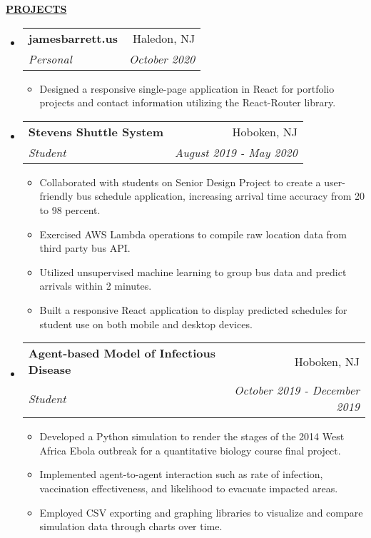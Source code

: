 \documentclass[letterpaper,11pt]{article}
\makeatletter
\newcommand{\resheading}[1]{{{\begin{minipage}{\textwidth}{\textbf{#1 \vphantom{p\^{E}}}}\end{minipage}}}}
\newcommand{\ressubheading}[4]{
\begin{tabular*}{7.3in}{l@{\extracolsep{\fill}}r}
		\textbf{#1} & #2 \\
		\textit{#3} & \textit{#4} \\
\end{tabular*}}
\makeatother
\begin{document}
\resheading{\hspace{0em}\uline{\textsc{PROJECTS}\hfill}}
\vspace{-0.25in}

\begin{itemize}[leftmargin=*]
\item
	\ressubheading{jamesbarrett.us}{Haledon, NJ}{Personal}{October 2020}
	\vspace{-0.1in}
	\begin{itemize}[leftmargin=*]
	\setlength\itemsep{0em}
		\item{Designed a responsive single-page application in React for portfolio projects and contact
information utilizing the React-Router library.}
		
	\end{itemize}
	
\item
	\ressubheading{Stevens Shuttle System}{Hoboken, NJ}{Student}{August 2019 - May 2020}
	\vspace{-0.1in}
	\begin{itemize}[leftmargin=*]
	\setlength\itemsep{0em}
		\item{Collaborated with students on Senior Design Project to create a user-friendly bus schedule application, increasing arrival time accuracy from 20 to 98 percent.}
		\item{Exercised AWS Lambda operations to compile raw location data from third party bus API.}
		\item{Utilized unsupervised machine learning to group bus data and predict arrivals within 2 minutes.}
		\item{Built a responsive React application to display predicted schedules for student use on both mobile and desktop devices.}
	\end{itemize}

\item
	\ressubheading{Agent-based Model of Infectious Disease}{Hoboken, NJ}{Student}{October 2019 - December 2019}
	\vspace{-0.1in}
	\begin{itemize}[leftmargin=*]
	\setlength\itemsep{0em}
		\item{Developed a Python simulation to render the stages of the 2014 West Africa Ebola outbreak for a quantitative biology course final project.}
		\item{Implemented agent-to-agent interaction such as rate of infection, vaccination effectiveness, and likelihood to evacuate impacted areas.
}		
		\item{Employed CSV exporting and graphing libraries to visualize and compare simulation data through charts over time.}
		
	\end{itemize}
	
\end{itemize}
\end{document}
